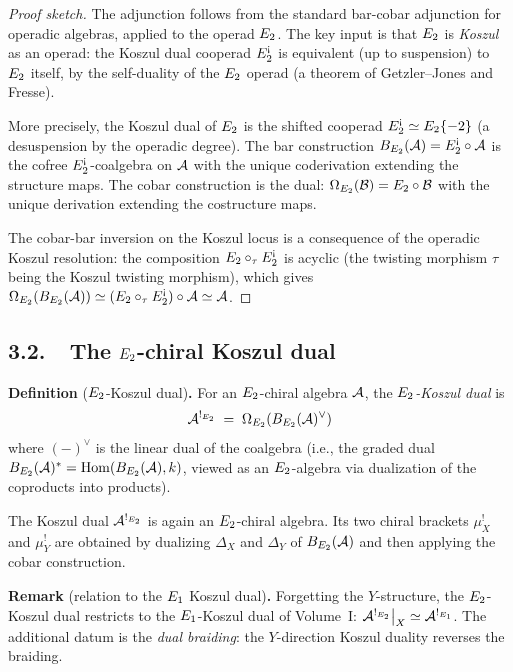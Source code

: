 \begin{proof}[Proof sketch]
The adjunction follows from the standard bar-cobar adjunction for
operadic algebras, applied to the operad $E_2$. The key input is
that $E_2$ is \emph{Koszul} as an operad: the Koszul dual cooperad
$E_2^{\scriptstyle\text{!`}}$ is equivalent (up to suspension) to
$E_2$ itself, by the self-duality of the $E_2$ operad
(a theorem of Getzler--Jones and Fresse).

More precisely, the Koszul dual of $E_2$ is the shifted cooperad
$E_2^{\scriptstyle\text{!`}} \simeq E_2\{-2\}$ (a desuspension
by the operadic degree). The bar construction
$B_{E_2}(\mathcal{A}) = E_2^{\scriptstyle\text{!`}} \circ \mathcal{A}$ is the
cofree $E_2^{\scriptstyle\text{!`}}$-coalgebra on $\mathcal{A}$ with the
unique coderivation extending the structure maps. The cobar
construction is the dual: $\Omega_{E_2}(\mathcal{B}) = E_2 \circ \mathcal{B}$
with the unique derivation extending the costructure maps.

The cobar-bar inversion on the Koszul locus is a consequence of the
operadic Koszul resolution: the composition
$E_2 \circ_\tau E_2^{\scriptstyle\text{!`}}$ is acyclic
(the twisting morphism $\tau$ being the Koszul twisting morphism),
which gives
$\Omega_{E_2}(B_{E_2}(\mathcal{A})) \simeq
(E_2 \circ_\tau E_2^{\scriptstyle\text{!`}}) \circ \mathcal{A}
\simeq \mathcal{A}$.
\end{proof}

\subsection*{3.2.\ \ The $E_2$-chiral Koszul dual}

\medskip
\noindent\textbf{Definition} ($E_2$-Koszul dual)\textbf{.}\;
For an $E_2$-chiral algebra $\mathcal{A}$, the \emph{$E_2$-Koszul dual} is
\[
 \mathcal{A}^{!_{E_2}}
 \;=\;
 \Omega_{E_2}(B_{E_2}(\mathcal{A})^\vee)
\]
where $(-)^\vee$ is the linear dual of the coalgebra (i.e., the
graded dual $B_{E_2}(\mathcal{A})^* = \mathrm{Hom}(B_{E_2}(\mathcal{A}), k)$, viewed
as an $E_2$-algebra via dualization of the coproducts into products).

The Koszul dual $\mathcal{A}^{!_{E_2}}$ is again an $E_2$-chiral algebra.
Its two chiral brackets $\mu_X^!$ and $\mu_Y^!$ are obtained by
dualizing $\Delta_X$ and $\Delta_Y$ of $B_{E_2}(\mathcal{A})$ and then
applying the cobar construction.

\medskip
\noindent\textbf{Remark} (relation to the $E_1$ Koszul dual)\textbf{.}
Forgetting the $Y$-structure, the $E_2$-Koszul dual restricts to
the $E_1$-Koszul dual of Volume~I:
$\mathcal{A}^{!_{E_2}}\big|_X \simeq \mathcal{A}^{!_{E_1}}$.
The additional datum is the \emph{dual braiding}: the $Y$-direction
Koszul duality reverses the braiding.

